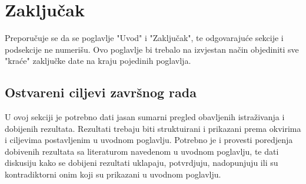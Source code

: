 \chapter*{Zaključak}

Preporučuje se da se poglavlje "Uvod" i "Zaključak", te odgovarajuće sekcije i podsekcije ne numerišu. Ovo poglavlje bi trebalo na izvjestan način objediniti sve "kraće" zaključke date na kraju pojedinih poglavlja.

\section*{Ostvareni ciljevi završnog rada}

U ovoj sekciji je potrebno dati jasan sumarni pregled obavljenih istraživanja i dobijenih rezultata. Rezultati trebaju biti struktuirani i prikazani prema okvirima i ciljevima postavljenim u uvodnom poglavlju.
Potrebno je i provesti poredjenja dobivenih rezultata sa literaturom navedenom u uvodnom poglavlju, te dati diskusiju kako se dobijeni rezultati uklapaju, potvrdjuju, nadopunjuju ili su kontradiktorni onim koji su prikazani u uvodnom poglavlju. 

